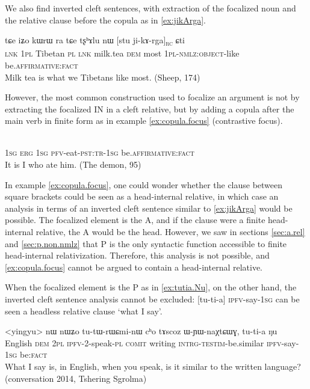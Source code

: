 \documentclass[oldfontcommands,oneside,a4paper,11pt]{article}
\newcommand{\ipa}[1]{{\phon #1}} %
\newcommand{\rc}{\textsubscript{\textsc{rc}}}
\begin{document}
We also find inverted cleft sentences, with extraction of the focalized noun and the relative clause before the copula as in \ref{ex:jikArga}.

\begin{exe}
\ex \label{ex:jikArga}
\gll 
\ipa{tɕe}  	\ipa{iʑo}  	\ipa{kɯrɯ}  	\ipa{ra}  	\ipa{tɕe}  	\ipa{tʂʰɤlu}  	\ipa{nɯ}  	[\ipa{stu}  	\ipa{ji-kɤ-rga}]\rc{}  	\ipa{ɕti}  \\
\textsc{lnk} \textsc{1pl} Tibetan \textsc{pl} \textsc{lnk} milk.tea \textsc{dem} most \textsc{1pl-nmlz:object}-like be.\textsc{affirmative:fact} \\
\glt Milk tea is what we Tibetans like most.  (Sheep, 174)
\end{exe}

However, the most common construction used to focalize an argument is not by extracting the focalized IN in a cleft relative, but by adding a copula  after the main verb in finite form as in example  \ref{ex:copula.focus} (contrastive focus).  

\begin{exe}
\ex \label{ex:copula.focus}
\gll 
  	[\ipa{aʑo}  	\ipa{kɯ}  	\ipa{ɯʑo}  	\ipa{tɤ-ndza-t-a}]  	\ipa{ɕti}  \\
  \textsc{1sg} \textsc{erg} \textsc{1sg} \textsc{pfv}-eat-\textsc{pst:tr-1sg} be.\textsc{affirmative:fact}\\
\glt It is I who ate him. (The demon, 95)
\end{exe}

In example \ref{ex:copula.focus}, one could wonder whether the clause  between square brackets could be seen as a head-internal relative, in which case an analysis in terms of an inverted cleft sentence similar to \ref{ex:jikArga} would be possible. The focalized element is the A, and if the clause were a finite head-internal relative, the A would be the head. However, we saw in sections \ref{sec:a.rel} and \ref{sec:p.non.nmlz} that P is the only syntactic function accessible to finite head-internal relativization. Therefore, this analysis is not possible, and \ref{ex:copula.focus}  cannot be argued to contain a head-internal relative.

When the focalized element is the P as in  \ref{ex:tutia.Nu}, on the other hand, the inverted cleft sentence analysis cannot be excluded: [\ipa{tu-ti-a}] \textsc{ipfv}-say-\textsc{1sg} can be seen a headless relative clause `what I say'.  

\begin{exe}
\ex \label{ex:tutia.Nu}
\gll 
<yingyu>  	\ipa{nɯ}  	\ipa{nɯʑo}  	\ipa{tu-tɯ-rɯɕmi-nɯ}  	\ipa{cʰo}  	\ipa{tɤscoz}  	\ipa{ɯ-ɲɯ-naχtɕɯɣ,}  	\ipa{tu-ti-a} 	\ipa{ŋu}  \\
English \textsc{dem} \textsc{2pl} \textsc{ipfv}-2-speak-\textsc{pl} \textsc{comit} writing \textsc{intrg-testim}-be.similar \textsc{ipfv}-say-\textsc{1sg} be:\textsc{fact} \\
\glt What I say is, in English, when you speak, is it similar to the written language? (conversation 2014, Tshering Sgrolma)
\end{exe}
\end{document}
